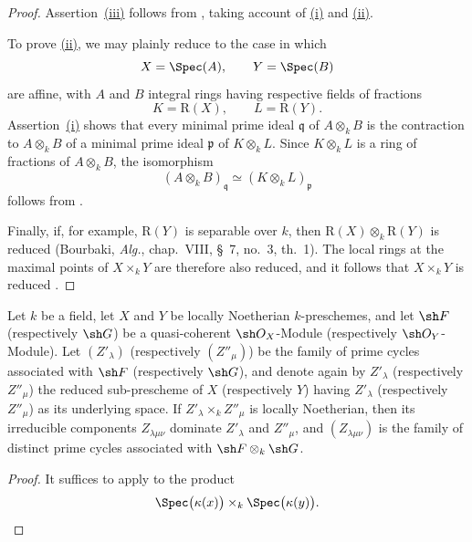 \begin{proof}
Assertion~{\hyperlink{ega4.c04.sec.4-2-4-iii}{(iii)}} follows from
, taking account of
{\hyperlink{ega4.c04.sec.4-2-4-i}{(i)}} and {\hyperlink{ega4.c04.sec.4-2-4-ii}{(ii)}}.

To prove {\hyperlink{ega4.c04.sec.4-2-4-ii}{(ii)}}, we may plainly reduce to the case
in which
\[
X=\Spec(A),
\qquad
Y=\Spec(B)
\]
are affine, with $A$ and $B$ integral rings having respective fields of
fractions
\[
K=\mathrm R(X),
\qquad
L=\mathrm R(Y).
\]
Assertion~{\hyperlink{ega4.c04.sec.4-2-4-i}{(i)}} shows that every minimal prime ideal
$\mathfrak q$ of $A\otimes_k B$ is the contraction to $A\otimes_k B$
of a minimal prime ideal $\mathfrak p$ of $K\otimes_k L$.
Since $K\otimes_k L$ is a ring of fractions of $A\otimes_k B$, the
isomorphism
\[
(A\otimes_k B)_{\mathfrak q}
\simeq
(K\otimes_k L)_{\mathfrak p}
\]
follows from .

Finally, if, for example, $\mathrm R(Y)$ is separable over $k$, then
$\mathrm R(X)\otimes_k\mathrm R(Y)$ is reduced
(Bourbaki, \emph{Alg.}, chap.~VIII, \S~7, no.~3, th.~1).
The local rings at the maximal points of $X\times_k Y$ are therefore
also reduced, and it follows that $X\times_k Y$ is reduced
.
\end{proof}

\begin{proposition}[4.2.5]
\label{IV.4.2.5}
Let $k$ be a field, let $X$ and $Y$ be locally Noetherian
$k$-preschemes, and let $\sh F$ (respectively $\sh G$) be a
quasi-coherent $\sh O_X$-Module (respectively $\sh O_Y$-Module).
Let $(Z'_\lambda)$ (respectively $(Z''_\mu)$) be the family of prime
cycles associated with $\sh F$ (respectively $\sh G$), and denote again
by $Z'_\lambda$ (respectively $Z''_\mu$) the reduced sub-prescheme of
$X$ (respectively $Y$) having $Z'_\lambda$ (respectively $Z''_\mu$) as
its underlying space.
If $Z'_\lambda\times_k Z''_\mu$ is locally Noetherian, then its
irreducible components $Z_{\lambda\mu\nu}$ dominate $Z'_\lambda$ and
$Z''_\mu$, and $(Z_{\lambda\mu\nu})$ is the family of distinct prime
cycles associated with $\sh F\otimes_k\sh G$.
\end{proposition}

\begin{proof}
It suffices to apply  to the product
\[
\Spec\bigl(\kappa(x)\bigr)\times_k\Spec\bigl(\kappa(y)\bigr).
\]
\end{proof}

